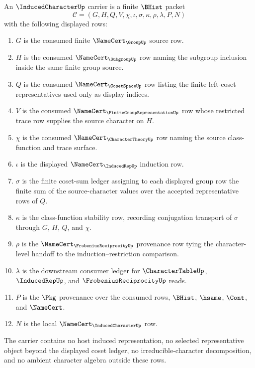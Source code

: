 \begin{definition}
\label{def:induced-character-carrier}
An $\InducedCharacterUp$ carrier is a finite $\BHist$ packet
$$
\mathcal{C}=(G,H,Q,V,\chi,\iota,\sigma,\kappa,\rho,\lambda,P,N)
$$
with the following displayed rows:
\begin{enumerate}
\item $G$ is the consumed finite $\NameCert_{\GroupUp}$ source row.
\item $H$ is the consumed $\NameCert_{\SubgroupUp}$ row naming the subgroup inclusion inside the same finite group source.
\item $Q$ is the consumed $\NameCert_{\CosetSpaceUp}$ row listing the finite left-coset representatives used only as display indices.
\item $V$ is the consumed $\NameCert_{\FiniteGroupRepresentationUp}$ row whose restricted trace row supplies the source character on $H$.
\item $\chi$ is the consumed $\NameCert_{\CharacterTheoryUp}$ row naming the source class-function and trace surface.
\item $\iota$ is the displayed $\NameCert_{\InducedRepUp}$ induction row.
\item $\sigma$ is the finite coset-sum ledger assigning to each displayed group row the finite sum of the source-character values over the accepted representative rows of $Q$.
\item $\kappa$ is the class-function stability row, recording conjugation transport of $\sigma$ through $G$, $H$, $Q$, and $\chi$.
\item $\rho$ is the $\NameCert_{\FrobeniusReciprocityUp}$ provenance row tying the character-level handoff to the induction--restriction comparison.
\item $\lambda$ is the downstream consumer ledger for $\CharacterTableUp$, $\InducedRepUp$, and $\FrobeniusReciprocityUp$ reads.
\item $P$ is the $\Pkg$ provenance over the consumed rows, $\BHist$, $\hsame$, $\Cont$, and $\NameCert$.
\item $N$ is the local $\NameCert_{\InducedCharacterUp}$ row.
\end{enumerate}
The carrier contains no host induced representation, no selected representative object beyond the displayed coset ledger, no irreducible-character decomposition, and no ambient character algebra outside these rows.
\end{definition}

